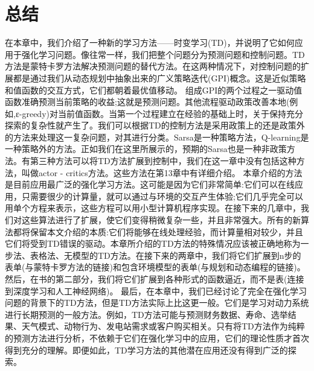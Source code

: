 \section{总结}
在本章中，我们介绍了一种新的学习方法——时变学习(TD)，并说明了它如何应用于强化学习问题。像往常一样，我们把整个问题分为预测问题和控制问题。TD方法是蒙特卡罗方法解决预测问题的替代方法。在这两种情况下，对控制问题的扩展都是通过我们从动态规划中抽象出来的广义策略迭代(GPI)概念。这是近似策略和值函数的交互方式，它们都朝着最优值移动。
组成GPI的两个过程之一驱动值函数准确预测当前策略的收益;这就是预测问题。其他流程驱动政策改善本地(例如,ε-greedy)对当前值函数。当第一个过程建立在经验的基础上时，关于保持充分探索的复杂性就产生了。我们可以根据TD的控制方法是采用政策上的还是政策外的方法来处理这一复杂问题，对其进行分类。Sarsa是一种策略方法，Q-learning是一种策略外的方法。正如我们在这里所展示的，预期的Sarsa也是一种非政策方法。有第三种方法可以将TD方法扩展到控制中，我们在这一章中没有包括这种方法，叫做actor - critics方法。这些方法在第13章中有详细介绍。
本章介绍的方法是目前应用最广泛的强化学习方法。这可能是因为它们非常简单:它们可以在线应用，只需要很少的计算量，就可以通过与环境的交互产生体验;它们几乎完全可以用单个方程来表示，这些方程可以用小型计算机程序实现。在接下来的几章中，我们对这些算法进行了扩展，使它们变得稍微复杂一些，并且非常强大。所有的新算法都将保留本文介绍的本质:它们将能够在线处理经验，而计算量相对较少，并且它们将受到TD错误的驱动。本章所介绍的TD方法的特殊情况应该被正确地称为一步法、表格法、无模型的TD方法。在接下来的两章中，我们将它们扩展到n步的表单(与蒙特卡罗方法的链接)和包含环境模型的表单(与规划和动态编程的链接)。然后，在书的第二部分，我们将它们扩展到各种形式的函数逼近，而不是表(连接到深度学习和人工神经网络)。
最后，在本章中，我们已经讨论了完全在强化学习问题的背景下的TD方法，但是TD方法实际上比这更一般。它们是学习对动力系统进行长期预测的一般方法。例如，TD方法可能与预测财务数据、寿命、选举结果、天气模式、动物行为、发电站需求或客户购买相关。只有将TD方法作为纯粹的预测方法进行分析，不依赖于它们在强化学习中的应用，它们的理论性质才首次得到充分的理解。即便如此，TD学习方法的其他潜在应用还没有得到广泛的探索。
